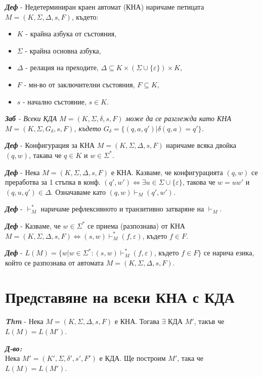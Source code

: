 \documentclass[fleqn,12pt]{article}
\begin{document}
\begin{flushleft}
\textit{\textbf{Деф}} - Недетерминиран краен автомат (КНА) наричаме петицата $M = (K, \Sigma, \Delta, s, F)$, където:
\begin{itemize}
    \item $K$ - крайна азбука от състояния,
    \item $\Sigma$ - крайна основна азбука,
    \item $\Delta$ - релация на преходите, $\Delta \subseteq K \times (\Sigma \cup \{ \varepsilon \} ) \times K$,
    \item $F$ - мн-во от заключителни състояния, $F \subseteq K$,
    \item $s$ - начално състояние, $s \in K$.
\end{itemize}

\textit{\textbf{Заб} - Всеки КДА $M = (K, \Sigma, \delta, s, F)$ може да се разглежда като КНА $M = (K, \Sigma, G_\delta, s, F)$, където $G_\delta = \{(q, a, q') | \delta(q, a) = q' \}$.}

\textit{\textbf{Деф}} - Конфигурация за КНА $M = (K, \Sigma, \Delta, s, F)$ наричаме всяка двойка $(q, w)$, такава че $q \in K$ и $w \in \Sigma^*$.

\textit{\textbf{Деф}} - Нека $M = (K, \Sigma, \Delta, s, F)$ е КНА. Казваме, че конфигурацията $(q, w)$ се преработва за 1 стъпка в конф. $(q', w') \iff \exists u \in \Sigma \cup \{\varepsilon\}$, такова че $w = uw'$ и $(q, u, q') \in \Delta$. Означаваме като $(q, w) \vdash_M (q', w')$.

\textit{\textbf{Деф}} - $\vdash_M^*$ наричаме рефлексивното и транзитивно затваряне на $\vdash_M$.

\textit{\textbf{Деф}} - Казваме, че $w \in \Sigma^*$ се приема (разпознава) от КНА $M = (K, \Sigma, \Delta, s, F) \iff (s, w) \vdash_M^* (f, \varepsilon)$, където $f \in F$. 

\textit{\textbf{Деф}} - $L(M) = \{w | w \in \Sigma^*: (s, w) \vdash_M^* (f, \varepsilon)$, където $f \in F\}$ се нарича езика, който се разпознава от автомата $M = (K, \Sigma, \Delta, s, F)$.

\section{Представяне на всеки КНА с КДА}

\textit{\textbf{Thm}} - Нека $M = (K, \Sigma, \Delta, s, F)$ е КНА. Тогава $\exists$ КДА $M'$, такъв че $L(M) = L(M')$.

\textit{\textbf{Д-во:}} \\
Нека $M' = (K', \Sigma, \delta', s', F')$ е КДА. Ще построим $M'$, така че $L(M) = L(M')$.


\end{flushleft}
\end{document}
